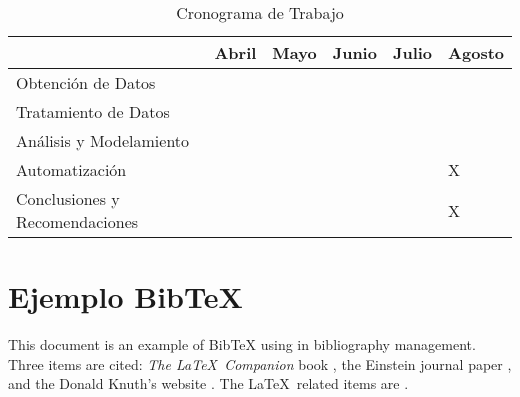 \documentclass[10pt,a4paper]{article}
\begin{document}
\begin{table}[h!]
\centering
\label{Cronograma}
\begin{tabular}{|m{2.5cm} *{5}{|m{0.95cm}}|}
\hline
       & Abril   & Mayo   & Junio   & Julio & Agosto  \\ \hline
Obtención de Datos   &   &   &   &  &  \\ \hline
Tratamiento de Datos  &   &   &   &  &  \\ \hline
Análisis y Modelamiento &   &  &   &  &  \\ \hline
Automatización  &   &   &   &  & X \\ \hline
Conclusiones y Recomendaciones  &   &   &   &  & X \\ 

\hline
\end{tabular}
\caption{Cronograma de Trabajo}
\end{table}



\section{Ejemplo BibTeX}
This document is an example of BibTeX using in bibliography management. Three items are cited: \textit{The \LaTeX\ Companion} book \cite{latexcompanion}, the Einstein journal paper \cite{einstein}, and the Donald Knuth's website \cite{knuthwebsite}. The \LaTeX\ related items are \cite{latexcompanion,knuthwebsite}. 



\end{document}
